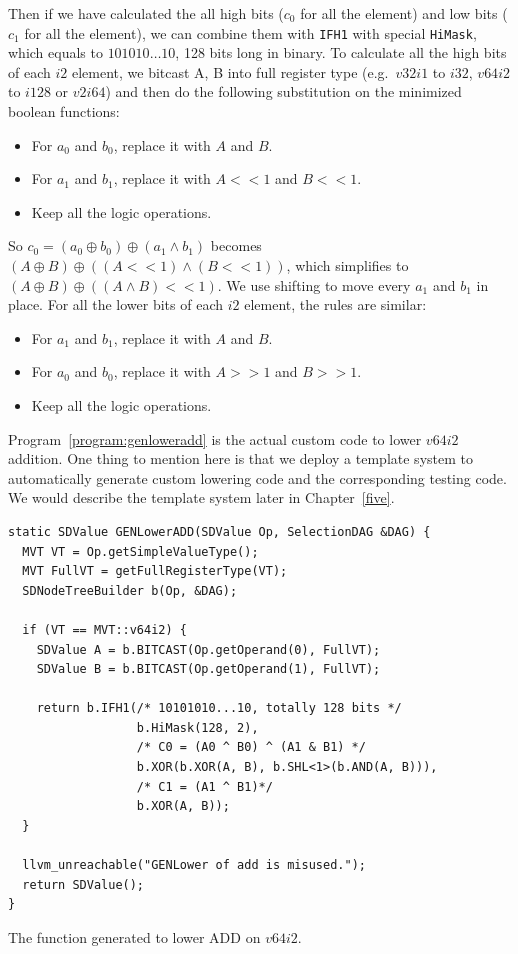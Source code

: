 Then if we have calculated the all high bits ($c_0$ for all the element) and low bits ($c_1$ for all the element), we can combine them with {\tt IFH1} with special {\tt HiMask}, which equals to $101010 \ldots 10$, 128 bits long in binary. To calculate all the high bits of each $i2$ element, we bitcast A, B into full register type (e.g.\ $v32i1$ to $i32$, $v64i2$ to $i128$ or $v2i64$) and then do the following substitution on the minimized boolean functions:

\begin{itemize}
    \item For $a_0$ and $b_0$, replace it with $A$ and $B$.
    \item For $a_1$ and $b_1$, replace it with $A << 1$ and $B << 1$.
    \item Keep all the logic operations.
\end{itemize}

So $c_0 = (a_0 \oplus b_0) \oplus (a_1 \land b_1)$ becomes $(A \oplus B) \oplus ((A << 1) \land (B << 1))$, which simplifies to $(A \oplus B) \oplus ((A \land B) << 1)$. We use shifting to move every $a_1$ and $b_1$ in place. For all the lower bits of each $i2$ element, the rules are similar:

\begin{itemize}
    \item For $a_1$ and $b_1$, replace it with $A$ and $B$.
    \item For $a_0$ and $b_0$, replace it with $A >> 1$ and $B >> 1$.
    \item Keep all the logic operations.
\end{itemize}

Program~\ref{program:genloweradd} is the actual custom code to lower $v64i2$ addition. One thing to mention here is that we deploy a template system to automatically generate custom lowering code and the corresponding testing code. We would describe the template system later in Chapter~\ref{five}.

\begin{program}
\begin{verbatim}
static SDValue GENLowerADD(SDValue Op, SelectionDAG &DAG) {
  MVT VT = Op.getSimpleValueType();
  MVT FullVT = getFullRegisterType(VT);
  SDNodeTreeBuilder b(Op, &DAG);

  if (VT == MVT::v64i2) {
    SDValue A = b.BITCAST(Op.getOperand(0), FullVT);
    SDValue B = b.BITCAST(Op.getOperand(1), FullVT);

    return b.IFH1(/* 10101010...10, totally 128 bits */
                  b.HiMask(128, 2),
                  /* C0 = (A0 ^ B0) ^ (A1 & B1) */
                  b.XOR(b.XOR(A, B), b.SHL<1>(b.AND(A, B))),
                  /* C1 = (A1 ^ B1)*/
                  b.XOR(A, B));
  }

  llvm_unreachable("GENLower of add is misused.");
  return SDValue();
}
\end{verbatim}
\caption{The function generated to lower ADD on $v64i2$.}
\label{program:genloweradd}
\end{program}

